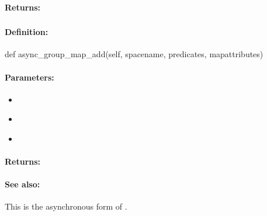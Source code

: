 \paragraph{Returns:}


\pagebreak
\subsubsection{}
\label{api:python:async_group_map_add}


\paragraph{Definition:}
\begin{pythoncode}
def async_group_map_add(self, spacename, predicates, mapattributes)
\end{pythoncode}

\paragraph{Parameters:}
\begin{itemize}[noitemsep]
\item {}\\

\item {}\\

\item {}\\

\end{itemize}

\paragraph{Returns:}


\paragraph{See also:}  This is the asynchronous form of .

\pagebreak
\subsubsection{}
\label{api:python:map_remove}


